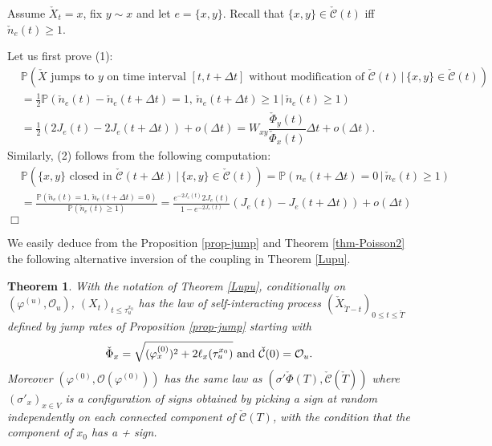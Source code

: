 \documentclass[11pt,a4paper]{amsart}
\numberwithin{equation}{section}
\newtheorem{theorem}{Theorem}
\def\ccc{{\mathcal C}}
\newcommand{\Pb}{\mathbb{P}}
\begin{document}
Assume $\check X_t=x$, fix $y\sim x$ and let $e=\{x,y\}$. Recall that $\{x,y\}\in\check\ccc(t)$ iff $\check n_e(t)\ge1$.

Let us first prove (1):
\begin{align*}
&\Pb\left(\check X\text{ jumps to $y$ on time interval $[t,t+\Delta t]$ without modification of }\check\ccc(t)\,|\,\{x,y\}\in\check\ccc(t)\right)\\
&=\frac{1}{2}\Pb\left(\check n_e(t)-\check n_e(t+\Delta t)=1,\,\check n_e(t+\Delta t)\ge1\,|\,\check n_e(t)\ge1\right)\\
&=\frac{1}{2}(2J_e(t)-2J_e(t+\Delta t))+o(\Delta t)=W_{xy}\dfrac{\check\Phi_{y}(t)}{\check\Phi_{x}(t)}\Delta t+o(\Delta t).
\end{align*}
Similarly, (2) follows from the following computation:
\begin{align*}
&\Pb\left(\{x,y\}\text{ closed in }\check\ccc(t+\Delta t)\,|\,\{x,y\}\in\check\ccc(t)\right)
=\Pb\left(n_e(t+\Delta t)=0\,|\,\check n_e(t)\ge1\right)\\
&=\frac{\Pb\left(\check n_e(t)=1,\,\check n_e(t+\Delta t)=0\right)}{\Pb\left(\check n_e(t)\ge1\right)}
=\frac{e^{-2J_e(t)}2J_e(t)}{1-e^{-2J_e(t)}}(J_e(t)-J_e(t+\Delta t))+o(\Delta t)
\end{align*}
{\hfill $\Box$}

We easily deduce from the Proposition \ref{prop-jump} and Theorem \ref{thm-Poisson2} the following alternative inversion of the coupling in Theorem \ref{Lupu}.
\begin{theorem}\label{thm-jump-rates}
With the notation of Theorem \ref{Lupu}, conditionally on $(\varphi^{(u)},\mathcal{O}_{u})$, $(X_{t})_{t\le \tau_{u}^{x_{0}}}$ has the law
of self-interacting process $(\check X_{\check T-t})_{0\le t\le \check T}$ defined by jump rates of Proposition \ref{prop-jump}
starting with 
$$
\check \Phi_x=\sqrt{(\varphi_{x}^{(0)})^2+2\ell_{x}(\tau_{u}^{x_{0}})} \hbox{ and } \check\ccc(0)=\mathcal{O}_{u}.
$$
Moreover $(\varphi^{(0)},\mathcal{O}(\varphi^{(0)}))$ has the same law as
$(\sigma'\check\Phi(T), \check\ccc(\check T))$ where $(\sigma'_x)_{x\in V}$ is a configuration of signs obtained by picking a sign at random independently on
each connected component of $\check\ccc(T)$, with the condition that the component of $x_0$ has a + sign.

\end{theorem}

\end{document}
